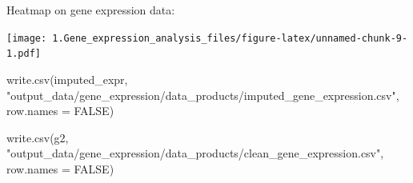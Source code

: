 \documentclass[
]{article}
\newenvironment{Shaded}{\begin{snugshade}}{\end{snugshade}}
\newcommand{\AttributeTok}[1]{\textcolor[rgb]{0.77,0.63,0.00}{#1}}
\newcommand{\ConstantTok}[1]{\textcolor[rgb]{0.00,0.00,0.00}{#1}}
\newcommand{\FunctionTok}[1]{\textcolor[rgb]{0.00,0.00,0.00}{#1}}
\newcommand{\NormalTok}[1]{#1}
\newcommand{\StringTok}[1]{\textcolor[rgb]{0.31,0.60,0.02}{#1}}
\begin{document}
Heatmap on gene expression data:

\texttt{[image: 1.Gene\_expression\_analysis\_files/figure-latex/unnamed-chunk-9-1.pdf]}

\begin{Shaded}
\begin{Highlighting}[]
\FunctionTok{write.csv}\NormalTok{(imputed\_expr, }\StringTok{"output\_data/gene\_expression/data\_products/imputed\_gene\_expression.csv"}\NormalTok{, }\AttributeTok{row.names =} \ConstantTok{FALSE}\NormalTok{)}

\FunctionTok{write.csv}\NormalTok{(g2, }\StringTok{"output\_data/gene\_expression/data\_products/clean\_gene\_expression.csv"}\NormalTok{, }\AttributeTok{row.names =} \ConstantTok{FALSE}\NormalTok{)}
\end{Highlighting}
\end{Shaded}
\end{document}

